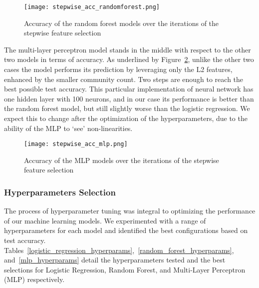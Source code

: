 \begin{figure}[h]
	\centering
	\texttt{[image: stepwise\_acc\_randomforest.png]}
	\caption{Accuracy of the random forest models over the iterations of the stepwise feature selection}\label{fig:stepwise_acc_randomforest}
\end{figure}
\noindent
The multi-layer perceptron model stands in the middle with respect to the other two models in terms of accuracy.
As underlined by Figure~\ref{fig:stepwise_acc_mlp}, unlike the other two cases the model performs its prediction by leveraging only the L2 features,
enhanced by the smaller community count. Two steps are enough to reach the best possible test accuracy.
This particular implementation of neural network has one hidden layer with 100 neurons, and in our case its performance is better
than the random forest model, but still slightly worse than the logistic regression. We expect this to change after the optimization of the hyperparameters,
due to the ability of the MLP to `see' non-linearities.

\begin{figure}[h]
	\centering
	\texttt{[image: stepwise\_acc\_mlp.png]}
	\caption{Accuracy of the MLP models over the iterations of the stepwise feature selection}\label{fig:stepwise_acc_mlp}
\end{figure}

\nocite{Zhang_2016}
\subsubsection*{Hyperparameters Selection}

The process of hyperparameter tuning was integral to optimizing the performance of our machine learning models.
We experimented with a range of hyperparameters for each model and identified the best configurations based on test accuracy.
Tables~\ref{logistic_regression_hyperparams},~\ref{random_forest_hyperparams}, and~\ref{mlp_hyperparams} detail the hyperparameters
tested and the best selections for Logistic Regression, Random Forest, and Multi-Layer Perceptron (MLP) respectively.


